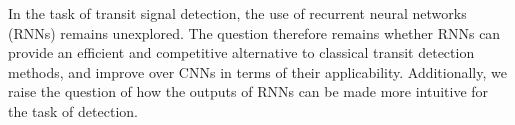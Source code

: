 In the task of transit signal detection, the use of recurrent neural networks (RNNs) remains unexplored. 
The question therefore remains whether RNNs can provide an efficient and competitive alternative to classical transit detection methods, and improve over CNNs in terms of their applicability. Additionally, we raise the question of how the outputs of RNNs can be made more intuitive for the task of detection. 

